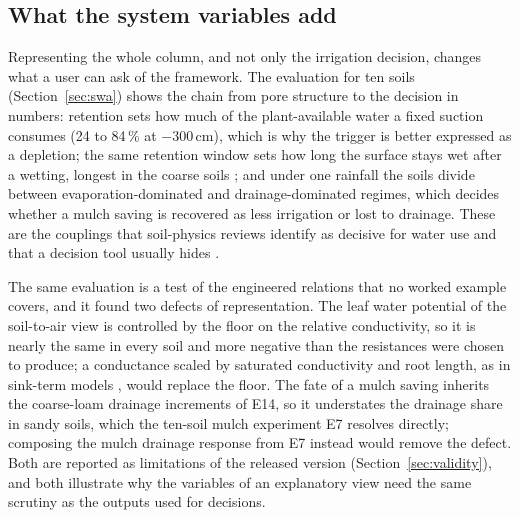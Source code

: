 \documentclass[preprint,12pt]{elsarticle}
\begin{document}
\subsection{What the system variables add}
\label{sec:disc-swa}
Representing the whole column, and not only the irrigation decision, changes what a user can ask of the framework. The evaluation for ten soils (Section~\ref{sec:swa}) shows the chain from pore structure to the decision in numbers: retention sets how much of the plant-available water a fixed suction consumes (24 to 84\,\% at $-300$\,cm), which is why the trigger is better expressed as a depletion; the same retention window sets how long the surface stays wet after a wetting, longest in the coarse soils \cite{Lehmann2008}; and under one rainfall the soils divide between evaporation-dominated and drainage-dominated regimes, which decides whether a mulch saving is recovered as less irrigation or lost to drainage. These are the couplings that soil-physics reviews identify as decisive for water use and that a decision tool usually hides \cite{Or2013,Vereecken2016}.

The same evaluation is a test of the engineered relations that no worked example covers, and it found two defects of representation. The leaf water potential of the soil-to-air view is controlled by the floor on the relative conductivity, so it is nearly the same in every soil and more negative than the resistances were chosen to produce; a conductance scaled by saturated conductivity and root length, as in sink-term models \cite{Feddes1978}, would replace the floor. The fate of a mulch saving inherits the coarse-loam drainage increments of E14, so it understates the drainage share in sandy soils, which the ten-soil mulch experiment E7 resolves directly; composing the mulch drainage response from E7 instead would remove the defect. Both are reported as limitations of the released version (Section~\ref{sec:validity}), and both illustrate why the variables of an explanatory view need the same scrutiny as the outputs used for decisions.
\end{document}
